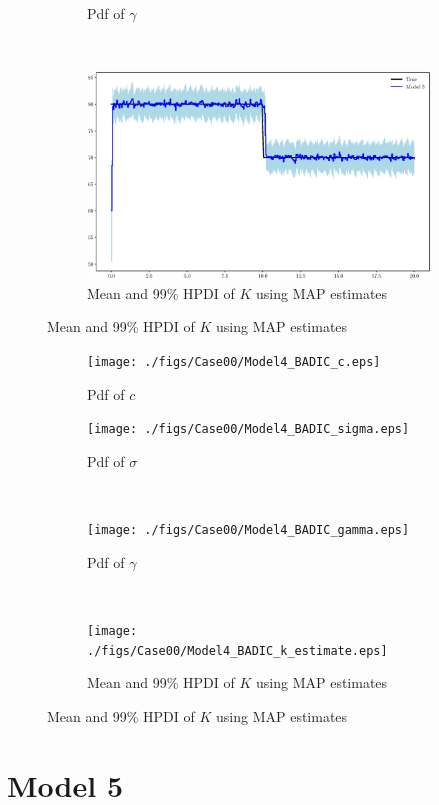 \documentclass[]{elsarticle}
\begin{document}
\begin{figure}[!htb]
\begin{subfigure}{.49\textwidth}
\caption{Pdf of $\gamma$}
\label{fig:s1c}
\end{subfigure}\\
\begin{subfigure}{.99\textwidth}
\centering
\includegraphics[width=\linewidth,keepaspectratio]{./figs/Case00/Model4_k_estimate.eps}
\caption{Mean and 99\% HPDI of $K$ using MAP estimates}
\label{fig:s1d}
\end{subfigure}
\end{figure}

\begin{figure}[!htb]
\centering
\begin{subfigure}{.49\textwidth}
\texttt{[image: ./figs/Case00/Model4\_BADIC\_c.eps]}
\caption{Pdf of $c$}
\end{subfigure}
\begin{subfigure}{.49\textwidth}
\centering
\texttt{[image: ./figs/Case00/Model4\_BADIC\_sigma.eps]}
\caption{Pdf of $\sigma$}
\label{fig:s1c}
\end{subfigure}\\
\begin{subfigure}{.49\textwidth}
\centering
\texttt{[image: ./figs/Case00/Model4\_BADIC\_gamma.eps]}
\caption{Pdf of $\gamma$}
\label{fig:s1c}
\end{subfigure}\\
\begin{subfigure}{.99\textwidth}
\centering
\texttt{[image: ./figs/Case00/Model4\_BADIC\_k\_estimate.eps]}
\caption{Mean and 99\% HPDI of $K$ using MAP estimates}
\label{fig:s1d}
\end{subfigure}
\end{figure}


\section*{Model 5}
\end{document}
